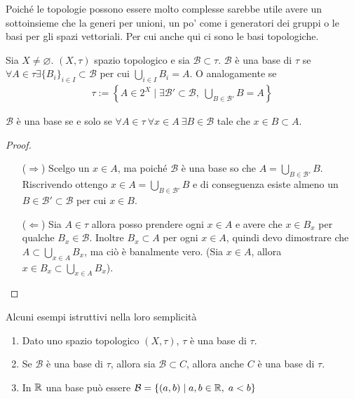 Poiché le topologie possono essere molto complesse sarebbe utile avere un sottoinsieme che la generi per unioni, un po' come i generatori dei gruppi o le basi per gli spazi vettoriali. Per cui anche qui ci sono le basi topologiche.

\begin{definition}
	Sia $X \neq \varnothing$. $(X, \tau)$ spazio topologico e sia $\mathcal{B} \subset \tau$.  $\mathcal{B}$ è una base di $\tau$ se $\forall A \in \tau \exists \{B_i\}_{i \in I} \subset \mathcal{B}$ per cui $\bigcup_{i \in I} B_i = A$. O analogamente se
	\begin{equation}
	\begin{aligned}	
		\tau := \left\{A \in 2^X \; | \; \exists \mathcal{B}' \subset \mathcal{B} , \; \bigcup_{B \in \mathcal{B}'} B = A \right\}
	\end{aligned}
	\end{equation}
\end{definition}

\begin{proposition}
	$\mathcal{B}$ è una base se e solo se $\forall A \in \tau\ \forall x \in A\ \exists B \in \mathcal{B}$ tale che $x \in B \subset A$.
\end{proposition}
\begin{proof}
	\begin{enumerate}
		\item[($\Rightarrow$)] Scelgo un $x \in A$, ma poiché $\mathcal{B}$ è una base so che $A = \bigcup_{B \in \mathcal{B}'} B$. Riscrivendo ottengo $x \in A = \bigcup_{B \in \mathcal{B}'} B$ e di conseguenza esiste almeno un $B \in \mathcal{B}' \subset \mathcal{B}$ per cui $x \in B$.
		\item[($\Leftarrow$)]  Sia $A \in \tau$ allora posso prendere ogni $x \in A$ e avere che $x \in B_x$ per qualche $B_x \in \mathcal{B}$. Inoltre $B_x \subset A$ per ogni $x \in A$, quindi devo dimostrare che $A \subset \bigcup_{x \in A} B_x$, ma ciò è banalmente vero. (Sia $x \in A$, allora $x \in B_x \subset \bigcup_{x \in A} B_x$).
	\end{enumerate}
\end{proof}

\begin{example}
	Alcuni esempi istruttivi nella loro semplicità
	\begin{enumerate}
		\item Dato uno spazio topologico $(X,\tau)$, $\tau$ è una base di $\tau$. 
		\item Se $\mathcal{B}$ è una base di $\tau$, allora sia $\mathcal{B} \subset C$, allora anche $C$ è una base di $\tau$.
		\item In $\mathbb{R}$ una base può essere $\mathcal{B} = \{(a,b) \; | \; a,b \in \mathbb{R}, \; a < b \}$
	\end{enumerate}
\end{example}

